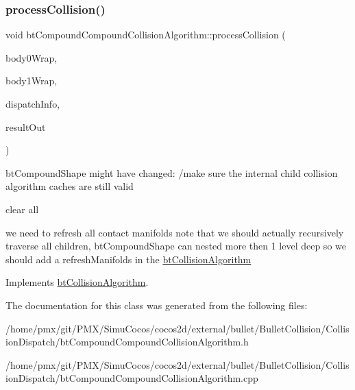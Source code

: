 \subsubsection{\texorpdfstring{process\+Collision()}{processCollision()}}
{\footnotesize\ttfamily void bt\+Compound\+Compound\+Collision\+Algorithm\+::process\+Collision (\begin{DoxyParamCaption}\item[{const \hyperlink{structbtCollisionObjectWrapper}{bt\+Collision\+Object\+Wrapper} $\ast$}]{body0\+Wrap,  }\item[{const \hyperlink{structbtCollisionObjectWrapper}{bt\+Collision\+Object\+Wrapper} $\ast$}]{body1\+Wrap,  }\item[{const \hyperlink{structbtDispatcherInfo}{bt\+Dispatcher\+Info} \&}]{dispatch\+Info,  }\item[{\hyperlink{classbtManifoldResult}{bt\+Manifold\+Result} $\ast$}]{result\+Out }\end{DoxyParamCaption})\hspace{0.3cm}{\ttfamily [virtual]}}

bt\+Compound\+Shape might have changed\+: /make sure the internal child collision algorithm caches are still valid

clear all

we need to refresh all contact manifolds note that we should actually recursively traverse all children, bt\+Compound\+Shape can nested more then 1 level deep so we should add a \textquotesingle{}refresh\+Manifolds\textquotesingle{} in the \hyperlink{classbtCollisionAlgorithm}{bt\+Collision\+Algorithm} 

Implements \hyperlink{classbtCollisionAlgorithm}{bt\+Collision\+Algorithm}.



The documentation for this class was generated from the following files\+:\begin{DoxyCompactItemize}
\item 
/home/pmx/git/\+P\+M\+X/\+Simu\+Cocos/cocos2d/external/bullet/\+Bullet\+Collision/\+Collision\+Dispatch/bt\+Compound\+Compound\+Collision\+Algorithm.\+h\item 
/home/pmx/git/\+P\+M\+X/\+Simu\+Cocos/cocos2d/external/bullet/\+Bullet\+Collision/\+Collision\+Dispatch/bt\+Compound\+Compound\+Collision\+Algorithm.\+cpp\end{DoxyCompactItemize}
